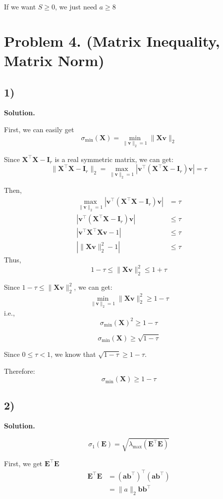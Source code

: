 \documentclass{article}
\newcommand{\0}{{\mathbf{0}}} %
\begin{document}
If we want $S \ge 0$, we just need $a \ge 8$

\section*{Problem 4. (Matrix Inequality, Matrix Norm)}

\subsection*{1)}

\textbf{Solution.}

First, we can easily get
$$\sigma_{\min}(\mathbf{X}) = \min_{\|\mathbf{v}\|_2=1} \|\mathbf{Xv}\|_2$$

Since $\mathbf{X}^\top \mathbf{X} - \mathbf{I}_r$ is a real symmetric matrix,
we can get:
$$\|\mathbf{X}^\top \mathbf{X} - \mathbf{I}_r\|_2 = \max_{\|\mathbf{v}\|_2=1} |\mathbf{v}^\top (\mathbf{X}^\top \mathbf{X} - \mathbf{I}_r) \mathbf{v}| = \tau$$

Then,
\begin{align*}
\max_{\|\mathbf{v}\|_2=1} |\mathbf{v}^\top (\mathbf{X}^\top \mathbf{X} - \mathbf{I}_r) \mathbf{v}| &= \tau  \\
|\mathbf{v}^\top (\mathbf{X}^\top \mathbf{X} - \mathbf{I}_r) \mathbf{v}| &\le \tau  \\
|\mathbf{v}^\top \mathbf{X}^\top \mathbf{X} \mathbf{v}- 1| &\le \tau    \\
|\|\mathbf{Xv}\|_2^2 - 1| &\leq \tau
\end{align*}
Thus,
$$1 - \tau \leq \|\mathbf{Xv}\|_2^2 \leq 1 + \tau$$

Since $1 - \tau \leq \|\mathbf{Xv}\|_2^2$, we can get:
$$\min_{\|\mathbf{v}\|_2=1} \|\mathbf{Xv}\|_2^2 \geq 1 - \tau$$
i.e.,
$$\sigma_{\min}(\mathbf{X})^2 \geq 1 - \tau$$

$$\sigma_{\min}(\mathbf{X}) \geq \sqrt{1 - \tau}$$

Since $0 \leq \tau < 1$, we know that $\sqrt{1-\tau} \geq 1-\tau$.

Therefore:$$\sigma_{\min}(\mathbf{X}) \geq 1 - \tau$$

\subsection*{2)}

\textbf{Solution.}

$$\sigma_1(\mathbf{E}) = \sqrt{\lambda_{\max}(\mathbf{E}^\top \mathbf{E})}$$

First, we get $\mathbf{E}^\top \mathbf{E}$
\begin{align*}
\mathbf{E}^\top \mathbf{E} &= (\mathbf{a}\mathbf{b}^\top)^\top (\mathbf{a}\mathbf{b}^\top)    \\
&= \|a\|_2 \mathbf{b} \mathbf{b}^\top
\end{align*}
\end{document}
